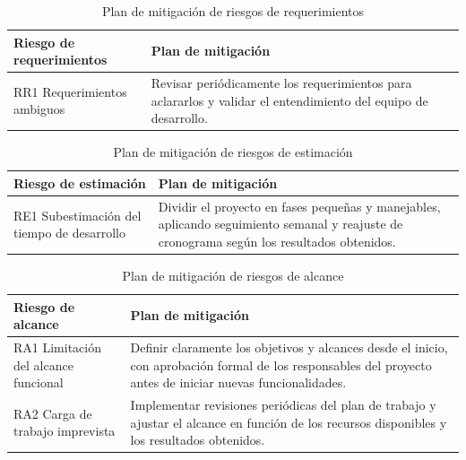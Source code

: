 \begin{table}[H]
	\centering
	\renewcommand{\arraystretch}{1.2}
	\setlength{\tabcolsep}{4pt}
	\begin{tabular}{|p{}|p{}|}
		\hline
		\textbf{Riesgo de requerimientos} & \textbf{Plan de mitigación} \\ \hline
		RR1 Requerimientos ambiguos & Revisar periódicamente los requerimientos para aclararlos y validar el entendimiento del equipo de desarrollo. \\ \hline
	\end{tabular}
	\caption{Plan de mitigación de riesgos de requerimientos}
	\label{table:mitigacion_requerimiento}
\end{table}

\begin{table}[H]
	\centering
	\renewcommand{\arraystretch}{1.2}
	\setlength{\tabcolsep}{4pt}
	\begin{tabular}{|p{}|p{}|}
		\hline
		\textbf{Riesgo de estimación} & \textbf{Plan de mitigación} \\ \hline
		RE1 Subestimación del tiempo de desarrollo & Dividir el proyecto en fases pequeñas y manejables, aplicando seguimiento semanal y reajuste de cronograma según los resultados obtenidos. \\ \hline
	\end{tabular}
	\caption{Plan de mitigación de riesgos de estimación}
	\label{table:mitigacion_estimacion}
\end{table}

\begin{table}[H]
	\centering
	\renewcommand{\arraystretch}{1.2}
	\setlength{\tabcolsep}{4pt}
	\begin{tabular}{|p{}|p{}|}
		\hline
		\textbf{Riesgo de alcance} & \textbf{Plan de mitigación} \\ \hline
		RA1 Limitación del alcance funcional & Definir claramente los objetivos y alcances desde el inicio, con aprobación formal de los responsables del proyecto antes de iniciar nuevas funcionalidades. \\ \hline
		RA2 Carga de trabajo imprevista & Implementar revisiones periódicas del plan de trabajo y ajustar el alcance en función de los recursos disponibles y los resultados obtenidos. \\ \hline
	\end{tabular}
	\caption{Plan de mitigación de riesgos de alcance}
	\label{table:mitigacion_alcance}
\end{table}

